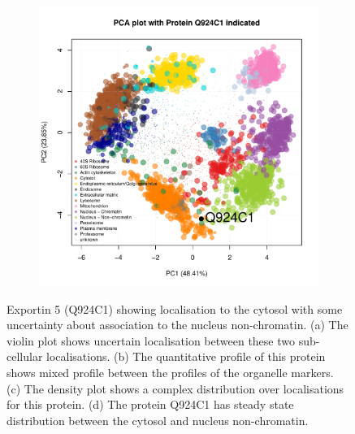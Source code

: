 \documentclass[12pt,english]{article}\usepackage[]{graphicx}\usepackage[]{color}
\makeatletter
\def\maxwidth{ %
  \ifdim\Gin@nat@width>\linewidth
    \linewidth
  \else
    \Gin@nat@width
  \fi
}
\newenvironment{knitrout}{}{} %
\makeatother
\begin{document}
\begin{figure}[h]
\begin{subfigure}[t]{0.5\textwidth}
\begin{knitrout}
{}



\end{knitrout}
    \caption{}
  \end{subfigure}%
  \begin{subfigure}[t]{0.5\textwidth}
    \centering
\begin{knitrout}
\color{fgcolor}
\includegraphics[width=\maxwidth]{figure/Q924C1-pca-1} 

\end{knitrout}
    \caption{}
  \end{subfigure}

  \caption{Exportin 5 (Q924C1) showing localisation to the cytosol
    with some uncertainty about association to the nucleus
    non-chromatin.  (a) The violin plot shows uncertain localisation
    between these two sub-cellular localisations. (b) The quantitative
    profile of this protein shows mixed profile between the profiles
    of the organelle markers. (c) The density plot shows a complex
    distribution over localisations for this protein. (d) The protein
    Q924C1 has steady state distribution between the cytosol and
    nucleus non-chromatin.}
  \label{fig:Q924C1}
\end{figure}
\end{document}
